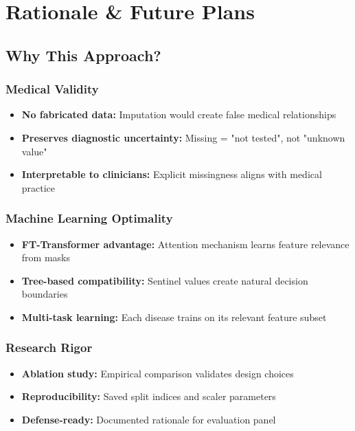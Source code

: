 \documentclass[12pt,a4paper]{article}
\begin{document}
\section{Rationale \& Future Plans}

\subsection{Why This Approach?}

\subsubsection{Medical Validity}
\begin{itemize}
    \item \textbf{No fabricated data:} Imputation would create false medical relationships
    \item \textbf{Preserves diagnostic uncertainty:} Missing = "not tested", not "unknown value"
    \item \textbf{Interpretable to clinicians:} Explicit missingness aligns with medical practice
\end{itemize}

\subsubsection{Machine Learning Optimality}
\begin{itemize}
    \item \textbf{FT-Transformer advantage:} Attention mechanism learns feature relevance from masks
    \item \textbf{Tree-based compatibility:} Sentinel values create natural decision boundaries
    \item \textbf{Multi-task learning:} Each disease trains on its relevant feature subset
\end{itemize}

\subsubsection{Research Rigor}
\begin{itemize}
    \item \textbf{Ablation study:} Empirical comparison validates design choices
    \item \textbf{Reproducibility:} Saved split indices and scaler parameters
    \item \textbf{Defense-ready:} Documented rationale for evaluation panel
\end{itemize}
\end{document}
